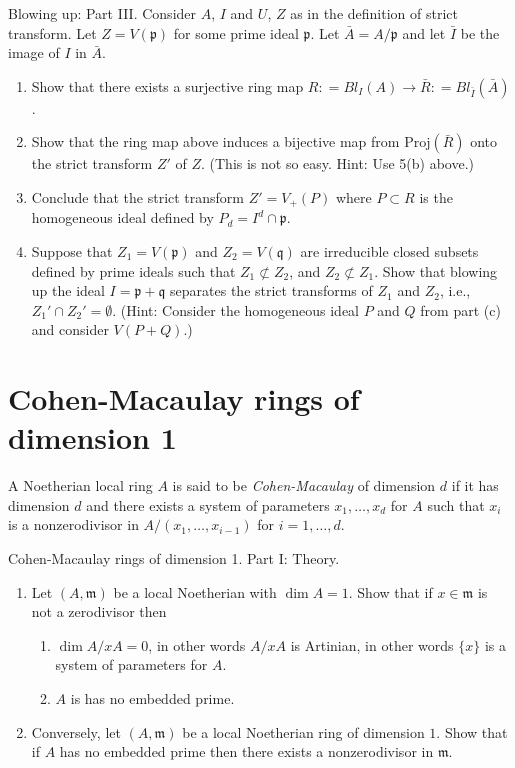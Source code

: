 \begin{exercise}
\label{exercise-blowing-up-III}
Blowing up: Part III.
Consider $A$, $I$ and $U$, $Z$ as in the definition of strict transform.
Let $Z = V({\mathfrak p})$ for some prime ideal ${\mathfrak p}$. Let $\bar A =
A/{\mathfrak p}$ and let
$\bar I$ be the image of $I$ in $\bar A$.
\begin{enumerate}
\item Show that there exists a surjective ring map
$R: = Bl_I(A) \to \bar R: = Bl_{\bar I}(\bar A)$.
\item Show that the ring map above induces a bijective map
from $\text{Proj}(\bar R)$ onto the strict transform $Z'$ of $Z$. (This
is not so easy. Hint: Use 5(b) above.)
\item Conclude that the strict transform $Z' = V_{+}(P)$ where
$P \subset R$ is the homogeneous ideal defined by
$P_d = I^d \cap {\mathfrak p}$.
\item Suppose that $Z_1 = V({\mathfrak p})$ and
$Z_2 = V({\mathfrak q})$ are irreducible
closed subsets defined by prime ideals such that  $Z_1 \not \subset Z_2$,
and $Z_2 \not \subset Z_1$. Show that blowing up the ideal
$I = {\mathfrak p} + {\mathfrak q}$ separates the
strict transforms of $Z_1$ and $Z_2$,
i.e., $Z_1' \cap Z_2' = \emptyset$. (Hint: Consider the homogeneous
ideal $P$ and $Q$ from part (c) and consider $V(P + Q)$.)
\end{enumerate}
\end{exercise}


\section{Cohen-Macaulay rings of dimension 1}
\label{section-CM-dim-1}

\begin{definition}
\label{definition-CM}
A Noetherian local ring $A$ is said to be {\it Cohen-Macaulay}
of dimension $d$ if it has dimension $d$ and there exists a system
of parameters $x_1, \ldots, x_d$ for $A$ such that $x_i$ is a nonzerodivisor
in $A/(x_1, \ldots, x_{i-1})$ for $i = 1, \ldots, d$.
\end{definition}

\begin{exercise}
\label{exercise-CM-dim-1-I}
Cohen-Macaulay rings of dimension 1. Part I: Theory.
\begin{enumerate}
\item Let $(A, {\mathfrak m})$ be a local Noetherian with $\dim A = 1$.
Show that if $x\in {\mathfrak m}$ is not a zerodivisor then
\begin{enumerate}
\item $\dim A/xA = 0$, in other words $A/xA$ is Artinian,
in other words $\{x\}$ is a system of parameters for $A$.
\item $A$ is has no embedded prime.
\end{enumerate}
\item Conversely, let $(A, {\mathfrak m})$ be a local Noetherian ring of
dimension $1$. Show that if $A$ has no embedded prime then there exists
a nonzerodivisor in ${\mathfrak m}$.
\end{enumerate}
\end{exercise}

